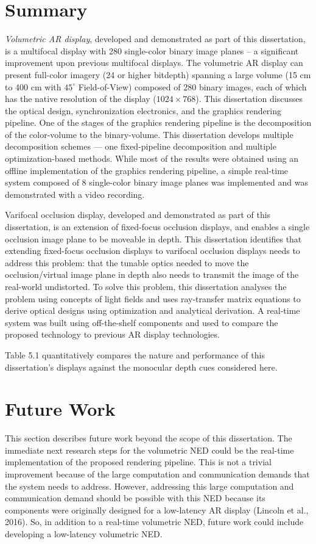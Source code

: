 \section{Summary}


\emph{Volumetric AR display}, developed and demonstrated as part of this dissertation, is a multifocal display with 280 single-color binary image planes – a significant improvement upon previous multifocal displays. The volumetric AR display can present full-color imagery (24 or higher bitdepth) spanning a large volume (15 cm to 400 cm with $45^\circ$ Field-of-View) composed of 280 binary images, each of which has the native resolution of the display ($1024 \times 768$). This dissertation discusses the optical design, synchronization electronics, and the graphics rendering pipeline. One of the stages of the graphics rendering pipeline is the decomposition of the color-volume to the binary-volume. This dissertation develops multiple decomposition schemes --- one fixed-pipeline decomposition and multiple optimization-based methods. While most of the results were obtained using an offline implementation of the graphics rendering pipeline, a simple real-time system composed of 8 single-color binary image planes was implemented and was demonstrated with a video recording. 

Varifocal occlusion display, developed and demonstrated as part of this dissertation, is an extension of fixed-focus occlusion displays, and enables a single occlusion image plane to be moveable in depth. This dissertation identifies that extending fixed-focus occlusion displays to varifocal occlusion displays needs to address this problem: that the tunable optics needed to move the occlusion/virtual image plane in depth also needs to transmit the image of the real-world undistorted. To solve this problem, this dissertation analyses the problem using concepts of light fields and uses ray-transfer matrix equations to derive optical designs using optimization and analytical derivation. A real-time system was built using off-the-shelf components and used to compare the proposed technology to previous AR display technologies.

Table 5.1 quantitatively compares the nature and performance of this dissertation’s displays against the monocular depth cues considered here. 

\section{Future Work}
This section describes future work beyond the scope of this dissertation. 
The immediate next research steps for the volumetric NED could be the real-time implementation of the proposed rendering pipeline. 
This is not a trivial improvement because of the large computation and communication demands that the system needs to address. 
However, addressing this large computation and communication demand should be possible with this NED because its components were originally designed for a low-latency AR display (Lincoln et al., 2016). 
So, in addition to a real-time volumetric NED, future work could include developing a low-latency volumetric NED. 

